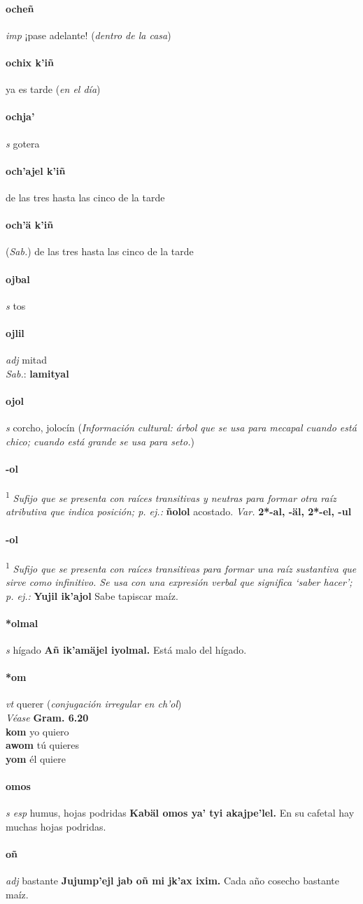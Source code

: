 \documentclass{scrbook}
\newcommand{\entry}[1]{\paragraph{#1}}
\newcommand{\defsuperscript}[1]{\textsuperscript{1}}
\newcommand{\nontranslationdef}[1]{\textit{#1}}
\newcommand{\partofspeech}[1]{\textit{#1}}
\newcommand{\spanishtranslation}[1]{#1}
\newcommand{\clarification}[1]{(\textit{#1})}
\newcommand{\cholexample}[1]{\textbf{#1}}
\newcommand{\exampletranslation}[1]{#1}
\newcommand{\dialectvariant}[1]{\\\textit{#1}:}
\newcommand{\dialectword}[1]{\textbf{#1}}
\newcommand{\alsosee}[1]{\\\textit{Véase} \textbf{#1}}
\newcommand{\relevantdialect}[1]{(\textit{#1})}
\newcommand{\culturalinformation}[1]{(\textit{#1})}
\newcommand{\secondaryentry}[1]{\\\textbf{#1}}
\newcommand{\secondtranslation}[1]{#1}
\newcommand{\variation}[1]{\textit{Var.} \textbf{#1}}
\begin{document}
\begin{multicols}{2}
\entry{ocheñ}
\partofspeech{imp}
\spanishtranslation{¡pase adelante!}
\clarification{dentro de la casa}

\entry{ochix k'iñ}
\spanishtranslation{ya es tarde}
\clarification{en el día}

\entry{ochja'}
\partofspeech{s}
\spanishtranslation{gotera}

\entry{och'ajel k'iñ}
\spanishtranslation{de las tres hasta las cinco de la tarde}

\entry{och'ä k'iñ}
\relevantdialect{Sab.}
\spanishtranslation{de las tres hasta las cinco de la tarde}

\entry{ojbal}
\partofspeech{s}
\spanishtranslation{tos}

\entry{ojlil}
\partofspeech{adj}
\spanishtranslation{mitad}
\dialectvariant{Sab.}
\dialectword{lamityal}

\entry{ojol}
\partofspeech{s}
\spanishtranslation{corcho, jolocín}
\culturalinformation{Información cultural: árbol que se usa para mecapal cuando está chico; cuando está grande se usa para seto.}

\entry{-ol}
\defsuperscript{1}
\nontranslationdef{Sufijo que se presenta con raíces transitivas y neutras para formar otra raíz atributiva que indica posición; p. ej.:}
\cholexample{ñolol}
\exampletranslation{acostado.}
\variation{2*-al, -äl, 2*-el, -ul}

\entry{-ol}
\defsuperscript{2}
\nontranslationdef{Sufijo que se presenta con raíces transitivas para formar una raíz sustantiva que sirve como infinitivo. Se usa con una expresión verbal que significa ‘saber hacer’; p. ej.:}
\cholexample{Yujil ik'ajol}
\exampletranslation{Sabe tapiscar maíz.}

\entry{*olmal}
\partofspeech{s}
\spanishtranslation{hígado}
\cholexample{Añ ik'amäjel iyolmal.}
\exampletranslation{Está malo del hígado.}

\entry{*om}
\partofspeech{vt}
\spanishtranslation{querer}
\clarification{conjugación irregular en ch'ol}
\alsosee{Gram. 6.20}
\secondaryentry{kom}
\secondtranslation{yo quiero}
\secondaryentry{awom}
\secondtranslation{tú quieres}
\secondaryentry{yom}
\secondtranslation{él quiere}

\entry{omos}
\partofspeech{s esp}
\spanishtranslation{humus, hojas podridas}
\cholexample{Kabäl omos ya' tyi akajpe'lel.}
\exampletranslation{En su cafetal hay muchas hojas podridas.}

\entry{oñ}
\partofspeech{adj}
\spanishtranslation{bastante}
\cholexample{Jujump'ejl jab oñ mi jk'ax ixim.}
\exampletranslation{Cada año cosecho bastante maíz.}


\end{multicols}
\end{document}

